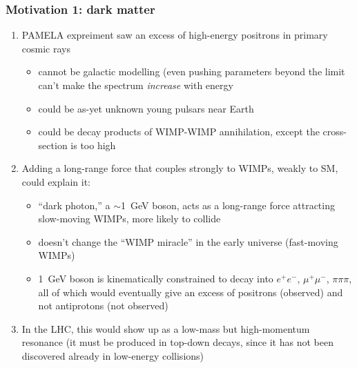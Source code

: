 \documentclass[compress]{beamer}
\begin{document}
\begin{frame}
\frametitle{Motivation 1: dark matter}
\begin{enumerate}
\item PAMELA expreiment saw an excess of high-energy positrons in primary cosmic rays
\begin{itemize}
\item cannot be galactic modelling (even pushing parameters beyond the limit can't make the spectrum {\it increase} with energy
\item could be as-yet unknown young pulsars near Earth
\item could be decay products of WIMP-WIMP annihilation, except the cross-section is too high
\end{itemize}

\item Adding a long-range force that couples strongly to WIMPs, weakly to SM, could explain it:
\begin{itemize}
\item ``dark photon,'' a $\sim$1~GeV boson, acts as a long-range force attracting slow-moving WIMPs, more likely to collide
\item doesn't change the ``WIMP miracle'' in the early universe (fast-moving WIMPs)
\item 1~GeV boson is kinematically constrained to decay into $e^+e^-$,
  $\mu^+\mu^-$, $\pi\pi\pi$, all of which would eventually give an
  excess of positrons (observed) and not antiprotons (not observed)
\end{itemize}

\item In the LHC, this would show up as a low-mass but high-momentum
  resonance (it must be produced in top-down decays, since it has not
  been discovered already in low-energy collisions)
\end{enumerate}
\end{frame}
\end{document}
